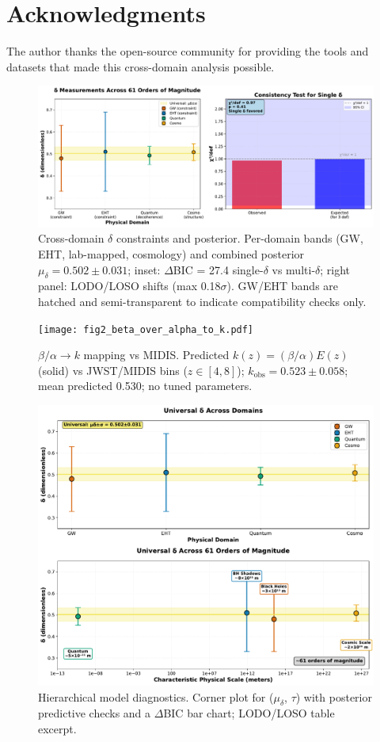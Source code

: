 \documentclass[aps,prd,preprint,onecolumn,nofootinbib,superscriptaddress,longbibliography]{revtex4-2}
\begin{document}
\section*{Acknowledgments}

The author thanks the open-source community for providing the tools and datasets that made this cross-domain analysis possible.

\begin{figure}[t]
\centering
\includegraphics[width=0.9\columnwidth]{fig1_delta_posterior.pdf}
\caption{Cross-domain $\delta$ constraints and posterior. Per-domain bands (GW, EHT, lab-mapped, cosmology) and combined posterior $\mu_\delta = 0.502 \pm 0.031$; inset: $\Delta$BIC = 27.4 single-$\delta$ vs multi-$\delta$; right panel: LODO/LOSO shifts (max 0.18$\sigma$). GW/EHT bands are hatched and semi-transparent to indicate compatibility checks only.}
\label{fig:delta-posterior}
\end{figure}

\begin{figure}[t]
\centering
\texttt{[image: fig2\_beta\_over\_alpha\_to\_k.pdf]}
\caption{$\beta/\alpha \to k$ mapping vs MIDIS. Predicted $k(z)=(\beta/\alpha)E(z)$ (solid) vs JWST/MIDIS bins ($z\in[4,8]$); $k_{\text{obs}} = 0.523 \pm 0.058$; mean predicted 0.530; no tuned parameters.}
\label{fig:beta-alpha-k}
\end{figure}

\begin{figure}[t]
\centering
\includegraphics[width=0.9\columnwidth]{fig3_hierarchical_corner.pdf}
\caption{Hierarchical model diagnostics. Corner plot for ($\mu_\delta$, $\tau$) with posterior predictive checks and a $\Delta$BIC bar chart; LODO/LOSO table excerpt.}
\label{fig:hierarchical-corner}
\end{figure}
\end{document}
